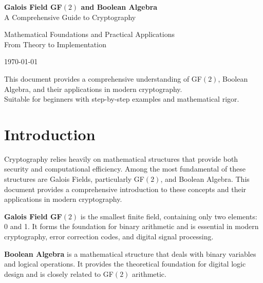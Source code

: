 \documentclass[11pt,a4paper]{article}
\begin{document}
\begin{titlepage}
    \centering
    \vspace*{2cm}
    
    {\Huge\bfseries\color{blue} Galois Field GF$(2)$ and Boolean Algebra}\\[0.5cm]
    {\Large A Comprehensive Guide to Cryptography}\\[1cm]
    
    \vspace{1cm}
    
    {\large Mathematical Foundations and Practical Applications}\\[0.5cm]
    {\large From Theory to Implementation}\\[2cm]
    
    \vspace{2cm}
    
    {\large \today}
    
    \vfill
    
    {\small This document provides a comprehensive understanding of GF$(2)$, Boolean Algebra, and their applications in modern cryptography.\\
    Suitable for beginners with step-by-step examples and mathematical rigor.}
\end{titlepage}

\tableofcontents
\newpage

\section{Introduction}

Cryptography relies heavily on mathematical structures that provide both security and computational efficiency. Among the most fundamental of these structures are Galois Fields, particularly GF$(2)$, and Boolean Algebra. This document provides a comprehensive introduction to these concepts and their applications in modern cryptography.

\begin{definitionbox}
\textbf{Galois Field GF$(2)$} is the smallest finite field, containing only two elements: 0 and 1. It forms the foundation for binary arithmetic and is essential in modern cryptography, error correction codes, and digital signal processing.
\end{definitionbox}

\begin{definitionbox}
\textbf{Boolean Algebra} is a mathematical structure that deals with binary variables and logical operations. It provides the theoretical foundation for digital logic design and is closely related to GF$(2)$ arithmetic.
\end{definitionbox}
\end{document}
